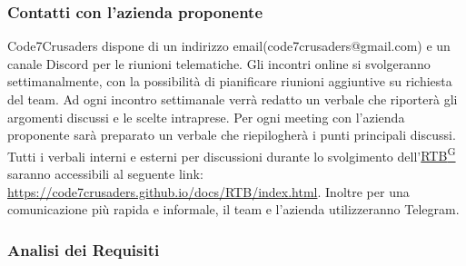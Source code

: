 \subsubsection{Contatti con l’azienda proponente}
Code7Crusaders dispone di un indirizzo email(code7crusaders@gmail.com) e un canale Discord per le riunioni telematiche. 
Gli incontri online si svolgeranno settimanalmente, con la possibilità di pianificare riunioni aggiuntive su richiesta del team.
Ad ogni incontro settimanale verrà redatto un verbale che riporterà gli argomenti discussi e le scelte intraprese.
Per ogni meeting con l’azienda proponente sarà preparato un verbale che riepilogherà i punti principali discussi. 
Tutti i verbali interni e esterni per discussioni durante lo svolgimento dell'\href{https://code7crusaders.github.io/docs/PB/documentazione_interna/glossario.html#rtb-requirements-and-technology-baseline}{RTB\textsuperscript{G}} saranno accessibili al seguente link: \url{https://code7crusaders.github.io/docs/RTB/index.html}.
Inoltre per una comunicazione più rapida e informale, il team e l'azienda utilizzeranno Telegram.

\subsubsection{Analisi dei Requisiti}

